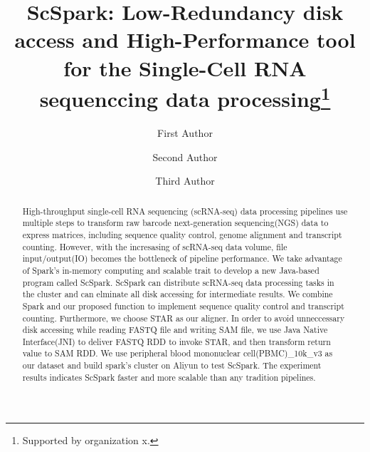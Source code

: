 \documentclass[runningheads]{llncs}
\begin{document}
%
\title{ScSpark: Low-Redundancy disk access and High-Performance tool for the Single-Cell RNA sequenccing data processing\thanks{Supported by organization x.}}
%
%
\author{First Author \and
Second Author \and
Third Author}
%
%
%
\maketitle
%
\begin{abstract}
High-throughput single-cell RNA sequencing
  (scRNA-seq) data processing pipelines use multiple steps to transform raw barcode next-generation sequencing(NGS) data to express matrices, including sequence quality control, genome alignment and transcript counting.
However, with the incresasing of scRNA-seq data volume, file input/output(IO) becomes the bottleneck of pipeline performance.
We take advantage of Spark's in-memory computing and scalable trait to develop a new Java-based program called ScSpark.
ScSpark can distribute scRNA-seq data processing tasks in the cluster and can elminate all disk accessing for intermediate results.
We combine Spark and our proposed function to implement sequence quality control and transcript counting.
Furthermore, we choose STAR as our aligner.
In order to avoid unneccessary disk accessing while reading FASTQ file and writing SAM file, we use Java Native Interface(JNI) to deliver FASTQ RDD to invoke STAR, and then transform return value to SAM RDD.
We use peripheral blood mononuclear cell(PBMC)\_10k\_v3 as our dataset and build spark's cluster on Aliyun to test ScSpark.
The experiment results indicates ScSpark faster and more scalable than any tradition pipelines.
\end{abstract}
\end{document}
